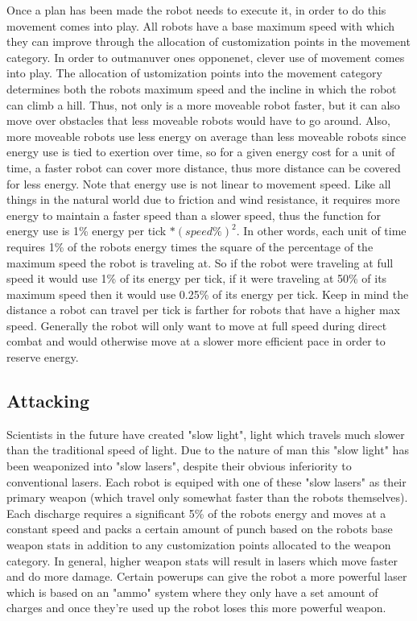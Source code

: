 \documentclass[a4paper]{article}
\begin{document}
Once a plan has been made the robot needs to execute it, in order to do this movement comes into play. All robots have a base maximum speed with which they can improve through the allocation of customization points in the movement category. In order to outmanuver ones opponenet, clever use of movement comes into play. The allocation of ustomization points into the movement category determines both the robots maximum speed and the incline in which the robot can climb a hill. Thus, not only is a more moveable robot faster, but it can also move over obstacles that less moveable robots would have to go around. Also, more moveable robots use less energy on average than less moveable robots since energy use is tied to exertion over time, so for a given energy cost for a unit of time, a faster robot can cover more distance, thus more distance can be covered for less energy. Note that energy use is not linear to movement speed. Like all things in the natural world due to friction and wind resistance, it requires more energy to maintain a faster speed than a slower speed, thus the function for energy use is 1\% energy per tick $*(speed\%)^2$. In other words, each unit of time requires 1\% of the robots energy times the square of the percentage of the maximum speed the robot is traveling at. So if the robot were traveling at full speed it would use 1\% of its energy per tick, if it were traveling at 50\% of its maximum speed then it would use 0.25\% of its energy per tick. Keep in mind the distance a robot can travel per tick is farther for robots that have a higher max speed. Generally the robot will only want to move at full speed during direct combat and would otherwise move at a slower more efficient pace in order to reserve energy.\\

\subsection{Attacking}

Scientists in the future have created "slow light", light which travels much slower than the traditional speed of light. Due to the nature of man this "slow light" has been weaponized into "slow lasers", despite their obvious inferiority to conventional lasers. Each robot is equiped with one of these "slow lasers" as their primary weapon (which travel only somewhat faster than the robots themselves). Each discharge requires a significant 5\% of the robots energy and moves at a constant speed and packs a certain amount of punch based on the robots base weapon stats in addition to any customization points allocated to the weapon category. In general, higher weapon stats will result in lasers which move faster and do more damage. Certain powerups can give the robot a more powerful laser which is based on an "ammo" system where they only have a set amount of charges and once they're used up the robot loses this more powerful weapon.\\
\end{document}
